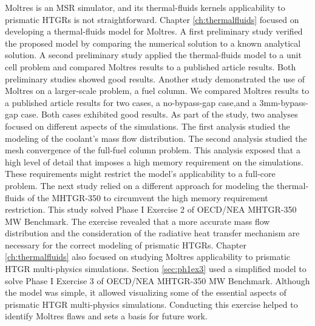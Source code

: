 Moltres is an MSR simulator, and its thermal-fluids kernels applicability to prismatic HTGRs is not straightforward.
Chapter \ref{ch:thermalfluids} focused on developing a thermal-fluids model for Moltres.
A first preliminary study verified the proposed model by comparing the numerical solution to a known analytical solution.
A second preliminary study applied the thermal-fluids model to a unit cell problem and compared Moltres results to a published article results.
Both preliminary studies showed good results.
Another study demonstrated the use of Moltres on a larger-scale problem, a fuel column.
We compared Moltres results to a published article results for two cases, a no-bypass-gap case,and a 3mm-bypass-gap case.
Both cases exhibited good results.
As part of the study, two analyses focused on different aspects of the simulations.
The first analysis studied the modeling of the coolant's mass flow distribution.
The second analysis studied the mesh convergence of the full-fuel column problem.
This analysis exposed that a high level of detail that imposes a high memory requirement on the simulations.
These requirements might restrict the model's applicability to a full-core problem.
The next study relied on a different approach for modeling the thermal-fluids of the MHTGR-350 to circumvent the high memory requirement restriction.
This study solved Phase I Exercise 2 of OECD/NEA MHTGR-350 MW Benchmark.
The exercise revealed that a more accurate mass flow distribution and the consideration of the radiative heat transfer mechanism are necessary for the correct modeling of prismatic HTGRs.
Chapter \ref{ch:thermalfluids} also focused on studying Moltres applicability to prismatic HTGR multi-physics simulations.
Section \ref{sec:ph1ex3} used a simplified model to solve Phase I Exercise 3 of OECD/NEA MHTGR-350 MW Benchmark.
Although the model was simple, it allowed visualizing some of the essential aspects of prismatic HTGR multi-physics simulations.
Conducting this exercise helped to identify Moltres flaws and sets a basis for future work.


